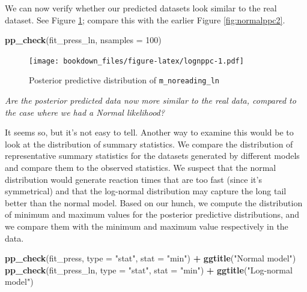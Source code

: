 \documentclass[12pt,]{krantz}
\newenvironment{Shaded}{\begin{snugshade}}{\end{snugshade}}
\newcommand{\DataTypeTok}[1]{\textcolor[rgb]{0.13,0.29,0.53}{#1}}
\newcommand{\DecValTok}[1]{\textcolor[rgb]{0.00,0.00,0.81}{#1}}
\newcommand{\KeywordTok}[1]{\textcolor[rgb]{0.13,0.29,0.53}{\textbf{#1}}}
\newcommand{\NormalTok}[1]{#1}
\newcommand{\OperatorTok}[1]{\textcolor[rgb]{0.81,0.36,0.00}{\textbf{#1}}}
\newcommand{\StringTok}[1]{\textcolor[rgb]{0.31,0.60,0.02}{#1}}
\theoremstyle{definition}
\theoremstyle{definition}
\theoremstyle{definition}
\theoremstyle{remark}
\begin{document}
We can now verify whether our predicted datasets look similar to
the real dataset. See Figure \ref{fig:lognppc}; compare this with the earlier Figure \ref{fig:normalppc2}.



\begin{Shaded}
\begin{Highlighting}[]
\KeywordTok{pp_check}\NormalTok{(fit_press_ln, }\DataTypeTok{nsamples =} \DecValTok{100}\NormalTok{)}
\end{Highlighting}
\end{Shaded}

\begin{figure}
\centering
\texttt{[image: bookdown\_files/figure-latex/lognppc-1.pdf]}
\caption{\label{fig:lognppc}Posterior predictive distribution of \texttt{m\_noreading\_ln}}
\end{figure}

\emph{Are the posterior predicted data now more similar to the real data, compared to the case where we had a Normal likelihood?}

It seems so, but it's not easy to tell. Another way to examine this would be to look at the distribution of summary statistics. We compare the distribution of representative summary statistics for the datasets generated by different models and compare them to the observed statistics. We suspect that the normal distribution would generate reaction times that are too fast (since it's symmetrical) and that the log-normal distribution may capture the long tail better than the normal model. Based on our hunch, we compute the distribution of minimum and maximum values for the posterior predictive distributions, and we compare them with the minimum and maximum value respectively in the data.

\begin{Shaded}
\begin{Highlighting}[]
\KeywordTok{pp_check}\NormalTok{(fit_press, }\DataTypeTok{type =} \StringTok{"stat"}\NormalTok{, }\DataTypeTok{stat =} \StringTok{"min"}\NormalTok{) }\OperatorTok{+}\StringTok{ }\KeywordTok{ggtitle}\NormalTok{(}\StringTok{"Normal model"}\NormalTok{)}
\KeywordTok{pp_check}\NormalTok{(fit_press_ln, }\DataTypeTok{type =} \StringTok{"stat"}\NormalTok{, }\DataTypeTok{stat =} \StringTok{"min"}\NormalTok{) }\OperatorTok{+}\StringTok{ }\KeywordTok{ggtitle}\NormalTok{(}\StringTok{"Log-normal model"}\NormalTok{)}
\end{Highlighting}
\end{Shaded}
\end{document}
